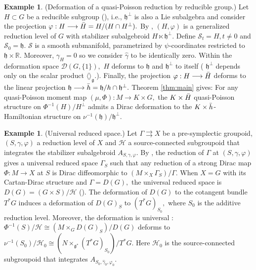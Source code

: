 \documentclass[reqno]{amsart}
\theoremstyle{plain}
\theoremstyle{definition}
\newtheorem{Exp}[Thm]{Example}
\newcommand{\R}{\mathbb{R}}
\renewcommand{\H}{\mathcal{H}}
\newcommand{\g}{\mathfrak{g}}
\newcommand{\h}{\mathfrak{h}}
\newcommand{\too}{\longrightarrow}
\renewcommand{\S}{\mathcal{S}}
\newcommand{\D}{\mathcal{D}}
\begin{document}
\begin{Exp}(Deformation of a quasi-Poisson reduction by reducible group.) Let $H\subset G$ be a reducible subgroup (\cite[]{bualibanu2026reduction}), i.e., $\h^{\perp}$ is also a Lie subalgebra and consider the projection $\varphi: H \too \Bar{H} = H/(H\cap H^{\perp}).$ By \cite[]{bualibanu2026reduction}, $(H,\varphi)$ is a generalized reduction level of $G$ with stabilizer subalgebroid $H \ltimes \h^{\perp}.$ Define $\S_t = H, t\neq 0$ and $\S_0 = \h.$ $\S$ is a smooth submanifold, parametrized by $\psi$-coordinates restricted to $\h \times \R.$ Moreover, $\gamma_H = 0$ so we consider $\widehat{\gamma}$ to be identically zero. Within the deformation space $\D(G,\{1\}),$ $H$ deforms to $\h$ and $\h^{\perp}$ to itself ( $\h^{\perp}$ depends only on the scalar product $\langle \rangle_{\g}.$). Finally, the projection $\varphi: H \too \Bar{H}$ deforms to the linear projection $\h \too \Bar{h} = \h/h\cap \h^{\perp}.$ Theorem \ref{thm:main} gives: For any quasi-Poisson moment map $(\mu,\Phi): M \too K\times G,$ the $K\times \Bar{H}$ quasi-Poisson structure on $\Phi^{-1}(H)/H^{\perp}$ \cite[]{bualibanu2026reduction} admits a Dirac deformation to the $K\times\Bar{h}$-Hamiltonian structure on $\nu^{-1}(\h)/\h^{\perp}.$
\end{Exp}



\begin{Exp}(Universal reduced space.) Let $\Gamma \rightrightarrows X$ be a pre-symplectic groupoid, $(S,\gamma,\varphi)$ a reduction level of $X$ and $\H$ a source-connected subgroupoid that integrates the stabilizer subalgebroid $A_{S,\gamma,\varphi}.$ By \cite[]{bualibanu2026reduction}, the reduction of $\Gamma$ at $(S,\gamma,\varphi)$ gives a universal reduced space $\Gamma_S$ such that any reduction of a strong Dirac map $\Phi: M\too X$ at $S$ is Dirac diffeomorphic to $(M\times_{X} \Gamma_S)/\Gamma.$ When $X = G$ with its Cartan-Dirac structure and $\Gamma = D(G),$ the universal reduced space is $D(G) = (G\times S)/\H$ (\cite[]{bualibanu2026reduction}). The deformation of $D(G)$ to the cotangent bundle $T^{*}G$ induces a deformation of $D(G)_S$ to $(T^{*}G)_{S_0},$ where $S_0$ is the additive reduction level. Moreover, the deformation is universal : $\Phi^{-1}(S)/\H \cong (M\times_{G} D(G)_S)/D(G)$ deforms to $\nu^{-1}(S_0)/\mathcal{H}_0 \cong (N\times_{\g^{*}} (T^{*}G)_{S_0})/T^{*}G.$ Here $\mathcal{H}_0$ is the source-connected subgroupoid that integrates $A_{S_0,\widehat{\gamma}_0,\varphi_0}.$ 
\end{Exp}
\end{document}
